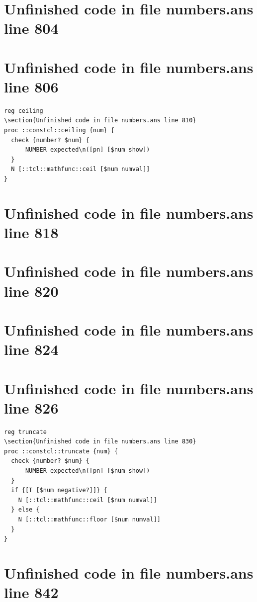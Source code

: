 \documentclass[twoside,9pt]{report}
\begin{document}
\section{Unfinished code in file numbers.ans line 804}
\section{Unfinished code in file numbers.ans line 806}
\begin{lstlisting}
reg ceiling
\section{Unfinished code in file numbers.ans line 810}
proc ::constcl::ceiling {num} {
  check {number? $num} {
      NUMBER expected\n([pn] [$num show])
  }
  N [::tcl::mathfunc::ceil [$num numval]]
}
\end{lstlisting}
\section{Unfinished code in file numbers.ans line 818}
\section{Unfinished code in file numbers.ans line 820}
\section{Unfinished code in file numbers.ans line 824}
\section{Unfinished code in file numbers.ans line 826}
\begin{lstlisting}
reg truncate
\section{Unfinished code in file numbers.ans line 830}
proc ::constcl::truncate {num} {
  check {number? $num} {
      NUMBER expected\n([pn] [$num show])
  }
  if {[T [$num negative?]]} {
    N [::tcl::mathfunc::ceil [$num numval]]
  } else {
    N [::tcl::mathfunc::floor [$num numval]]
  }
}
\end{lstlisting}
\section{Unfinished code in file numbers.ans line 842}
\end{document}
